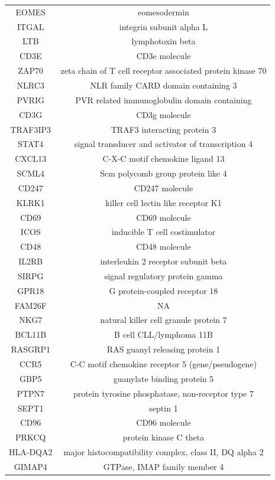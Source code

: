 \documentclass[12pt,]{book}
\theoremstyle{definition}
\theoremstyle{definition}
\theoremstyle{definition}
\theoremstyle{remark}
\begin{document}
\begin{longtable}[t]{cc}
\addlinespace
EOMES & eomesodermin\\
ITGAL & integrin subunit alpha L\\
LTB & lymphotoxin beta\\
CD3E & CD3e molecule\\
ZAP70 & zeta chain of T cell receptor associated protein kinase 70\\
\addlinespace
NLRC3 & NLR family CARD domain containing 3\\
PVRIG & PVR related immunoglobulin domain containing\\
CD3G & CD3g molecule\\
TRAF3IP3 & TRAF3 interacting protein 3\\
STAT4 & signal transducer and activator of transcription 4\\
\addlinespace
CXCL13 & C-X-C motif chemokine ligand 13\\
SCML4 & Scm polycomb group protein like 4\\
CD247 & CD247 molecule\\
KLRK1 & killer cell lectin like receptor K1\\
CD69 & CD69 molecule\\
\addlinespace
ICOS & inducible T cell costimulator\\
CD48 & CD48 molecule\\
IL2RB & interleukin 2 receptor subunit beta\\
SIRPG & signal regulatory protein gamma\\
GPR18 & G protein-coupled receptor 18\\
\addlinespace
FAM26F & NA\\
NKG7 & natural killer cell granule protein 7\\
BCL11B & B cell CLL/lymphoma 11B\\
RASGRP1 & RAS guanyl releasing protein 1\\
CCR5 & C-C motif chemokine receptor 5 (gene/pseudogene)\\
\addlinespace
GBP5 & guanylate binding protein 5\\
PTPN7 & protein tyrosine phosphatase, non-receptor type 7\\
SEPT1 & septin 1\\
CD96 & CD96 molecule\\
PRKCQ & protein kinase C theta\\
\addlinespace
HLA-DQA2 & major histocompatibility complex, class II, DQ alpha 2\\
GIMAP4 & GTPase, IMAP family member 4\\

\end{longtable}
\end{document}
